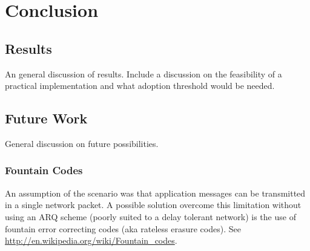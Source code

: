 \chapter{Conclusion} 

\section{Results}

An general discussion of results.
Include a discussion on the feasibility of a practical implementation and what adoption threshold would be needed.

\section{Future Work}

General discussion on future possibilities.

\subsection{Fountain Codes}
\label{sec:fountain_codes}

An assumption of the scenario was that application messages can be transmitted in a single network packet.
A possible solution overcome this limitation without using an ARQ scheme (poorly suited to a delay tolerant network) is the use of fountain error correcting codes (aka rateless erasure codes). 
See \url{http://en.wikipedia.org/wiki/Fountain_codes}.